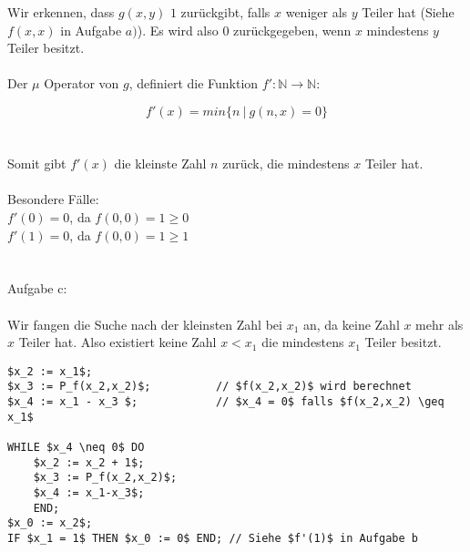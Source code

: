 \documentclass[a4paper,onecolumn,oneside,12pt,ngerman]{article}
\theoremstyle{plain} %
\theoremstyle{definition} %
\theoremstyle{remark} %
\theoremstyle{plain}
\newcommand{\NN}{\mathbb{N}} %
\begin{document}
Wir erkennen, dass $g(x,y)$ $1$  zurückgibt, falls $x$ weniger als $y$ Teiler hat (Siehe $f(x,x)$ in Aufgabe $a)$).
Es wird also $0$ zurückgegeben, wenn $x$ mindestens $y$ Teiler besitzt.
\\ \\
Der $\mu$ Operator von $g$, definiert die Funktion $f': \NN \rightarrow \NN:$

$$f'(x) = min \{ n\ |\ g(n,x) = 0\} $$
\\ \\ 
Somit gibt $f' (x)$ die kleinste Zahl $n$ zurück, die mindestens $x$ Teiler hat.
\\ \\
Besondere Fälle: \\
$f'(0) = 0$, da $f(0,0) = 1 \geq 0$ \\
$f'(1) = 0$, da $f(0,0) = 1 \geq 1$\\
\\ \\
 
Aufgabe c: \\
\\
Wir fangen die Suche nach der kleinsten Zahl bei $x_1$ an, da keine Zahl $x$ mehr als $x$ Teiler hat. Also existiert keine Zahl $x < x_1$ die mindestens $x_1$ Teiler besitzt. 
\begin{lstlisting}
$x_2 := x_1$;                   
$x_3 := P_f(x_2,x_2)$;          // $f(x_2,x_2)$ wird berechnet
$x_4 := x_1 - x_3 $;            // $x_4 = 0$ falls $f(x_2,x_2) \geq x_1$

WHILE $x_4 \neq 0$ DO
	$x_2 := x_2 + 1$;
	$x_3 := P_f(x_2,x_2)$;
	$x_4 := x_1-x_3$;
    END;
$x_0 := x_2$;
IF $x_1 = 1$ THEN $x_0 := 0$ END; // Siehe $f'(1)$ in Aufgabe b


\end{lstlisting}
\end{document}
